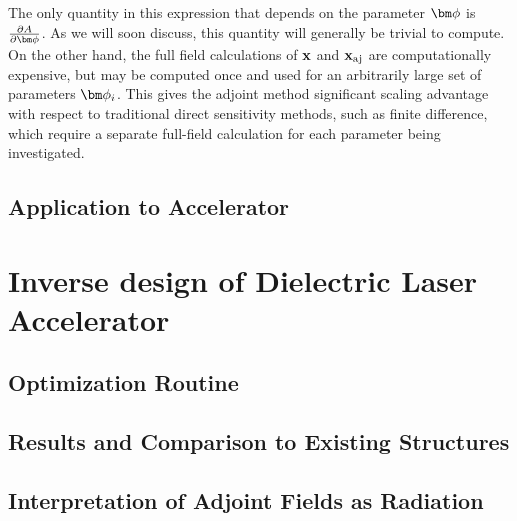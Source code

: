 
The only quantity in this expression that depends on the parameter $\bfphi$ is $\pfrac{A}{\bfphi}$.  As we will soon discuss, this quantity will generally be trivial to compute.
On the other hand, the full field calculations of $\mathbf{x}$ and $\mathbf{x}_{\textrm{aj}}$ are computationally expensive, but may be computed once and used for an arbitrarily large set of parameters $\bfphi_i$.
This gives the adjoint method significant scaling advantage with respect to traditional direct sensitivity methods, such as finite difference, which require a separate full-field calculation for each parameter being investigated.

\subsection{Application to Accelerator}

\section{Inverse design of Dielectric Laser Accelerator}{}

\subsection{Optimization Routine}

\subsection{Results and Comparison to Existing Structures}

\subsection{Interpretation of Adjoint Fields as Radiation}

